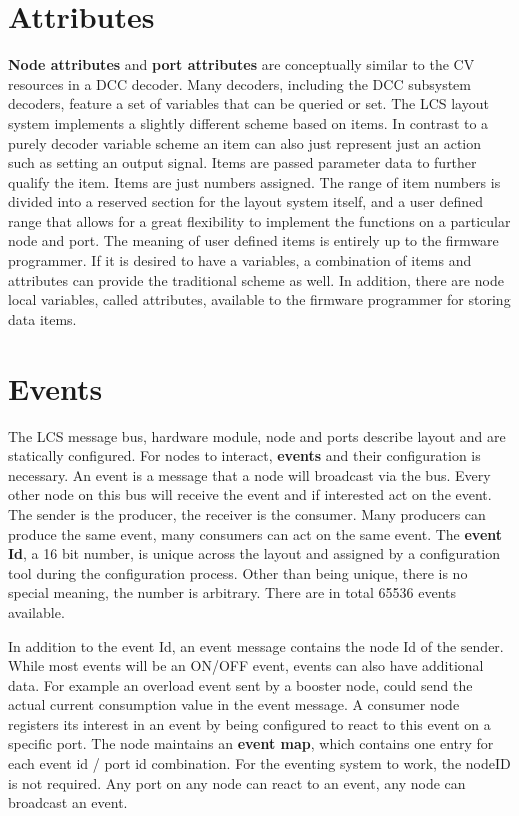 \section{Attributes}

{\bf Node attributes} and {\bf port attributes} are conceptually similar to the CV resources in a DCC decoder. Many decoders, including the DCC subsystem decoders, feature a set of variables that can be queried or set. The LCS layout system implements a slightly different scheme based on items. In contrast to a purely decoder variable scheme an item can also just represent just an action such as setting an output signal. Items are passed parameter data to further qualify the item. Items are just numbers assigned. The range of item numbers is divided into a reserved section for the layout system itself, and a user defined range that allows for a great flexibility to implement the functions on a particular node and port. The meaning of user defined items is entirely up to the firmware programmer. If it is desired to have a variables, a combination of items and attributes can provide the traditional scheme as well. In addition, there are node local variables, called attributes, available to the firmware programmer for storing data items.

\section{Events}

The LCS message bus, hardware module, node and ports describe layout and are statically configured. For nodes to interact, {\bf events} and their configuration is necessary. An event is a message that a node will broadcast via the bus. Every other node on this bus will receive the event and if interested act on the event. The sender is the producer, the receiver is the consumer. Many producers can produce the same event, many consumers can act on the same event. The {\bf event Id}, a 16 bit number, is unique across the layout and assigned by a configuration tool during the configuration process. Other than being unique, there is no special meaning, the number is arbitrary. There are in total 65536 events available.

In addition to the event Id, an event message contains the node Id of the sender. While most events will be an ON/OFF event, events can also have additional data. For example an overload event sent by a booster node, could send the actual current consumption value in the event message. A consumer node registers its interest in an event by being configured to react to this event on a specific port. The node maintains an {\bf event map}, which contains one entry for each event id / port id combination. For the eventing system to work, the nodeID is not required. Any port on any node can react to an event, any node can broadcast an event.

